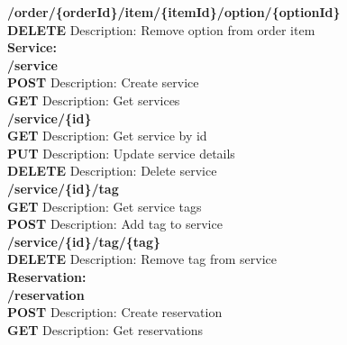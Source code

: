 \documentclass[11pt,a4paper,pdftex]{article}
\begin{document}
\hspace*{1em}\textbf{/order/\{\textbf{orderId}\}/item/\{\textbf{itemId}\}/option/\{\textbf{optionId}\}}\\
\hspace*{2em}\textbf{DELETE} Description: Remove option from order item\\


\textbf{Service:}\\
\hspace*{1em}\textbf{/service}\\
\hspace*{2em}\textbf{POST} Description: Create service\\
\hspace*{2em}\textbf{GET} Description: Get services\\

\hspace*{1em}\textbf{/service/\{\textbf{id}\}}\\
\hspace*{2em}\textbf{GET} Description: Get service by id\\
\hspace*{2em}\textbf{PUT} Description: Update service details\\
\hspace*{2em}\textbf{DELETE} Description: Delete service\\

\hspace*{1em}\textbf{/service/\{\textbf{id}\}/tag}\\
\hspace*{2em}\textbf{GET} Description: Get service tags\\
\hspace*{2em}\textbf{POST} Description: Add tag to service\\

\hspace*{1em}\textbf{/service/\{\textbf{id}\}/tag/\{\textbf{tag}\}}\\
\hspace*{2em}\textbf{DELETE} Description: Remove tag from service\\



\textbf{Reservation:}\\
\hspace*{1em}\textbf{/reservation}\\
\hspace*{2em}\textbf{POST} Description: Create reservation\\
\hspace*{2em}\textbf{GET} Description: Get reservations\\
\end{document}
